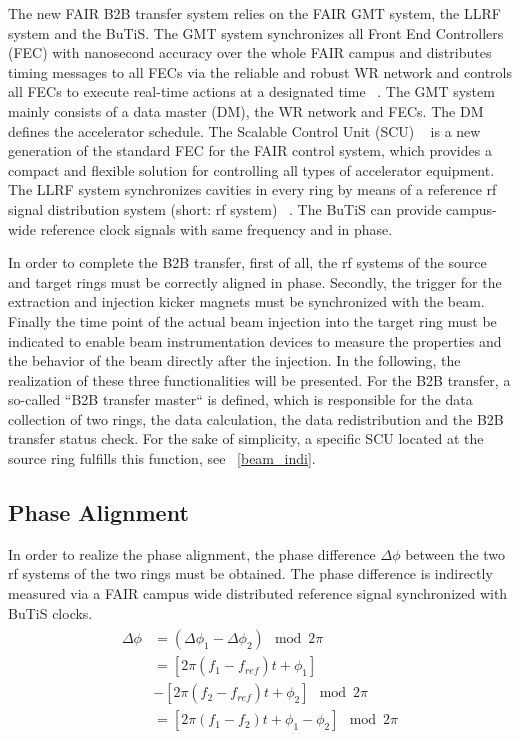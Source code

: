 The new FAIR B2B transfer system relies on the FAIR GMT system, the LLRF system and the BuTiS. The GMT system synchronizes all Front End Controllers (FEC) with nanosecond accuracy over the whole FAIR campus and distributes timing messages to all FECs via the reliable and robust WR network and controls all FECs to execute real-time actions at a designated time ~\cite{beck_new_2012}. The GMT system mainly consists of a data master (DM), the WR network and FECs. The DM defines the accelerator schedule. The Scalable Control Unit (SCU) ~\cite{kaiser_f-tn-c-008e_2014} is a new generation of the standard FEC for the FAIR control system, which provides a compact and flexible solution for controlling all types of accelerator equipment. The LLRF system synchronizes cavities in every ring by means of a reference rf signal distribution system (short: rf system) ~\cite{klingbeil_detailed_2013}. The BuTiS can provide campus-wide reference clock signals with same frequency and in phase.

In order to complete the B2B transfer, first of all, the rf systems of the source and target rings must be correctly aligned in phase. Secondly, the trigger for the extraction and injection kicker magnets must be synchronized with the beam. Finally the time point of the actual beam injection into the target ring must be indicated to enable beam instrumentation devices to measure the properties and the behavior of the beam directly after the injection. In the following, the realization of these three functionalities will be presented. For the B2B transfer, a so-called “B2B transfer master“ is defined, which is responsible for the data collection of two rings, the data calculation, the data redistribution and the B2B transfer status check. For the sake of simplicity, a specific SCU located at the source ring fulfills this function, see ~\ref{beam_indi}.

\subsection{Phase Alignment}
In order to realize the phase alignment, the phase difference $\Delta \phi$ between the two rf systems of the two rings must be obtained. The phase difference is indirectly measured via a FAIR campus wide distributed reference signal synchronized with BuTiS clocks. 
\begin{eqnarray}
\begin{aligned}
	\Delta \phi&=(\Delta \phi_1-\Delta \phi_2) \mod 2\pi\\
&=[2\pi(f_1-f_\mathit{ref})t+\phi_1]\\
&-[2\pi(f_2-f_\mathit{ref})t+\phi_2] \mod 2\pi \\
&=[2\pi(f_1-f_2)t+\phi_1-\phi_2] \mod 2\pi
\end{aligned}
\end{eqnarray}

